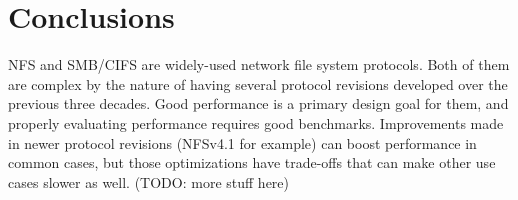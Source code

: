 \section{Conclusions}
NFS and SMB/CIFS are widely-used network file system protocols.
Both of them are complex by the nature of having several protocol revisions developed over the previous three decades.
Good performance is a primary design goal for them, and properly evaluating performance requires good benchmarks.
Improvements made in newer protocol revisions (NFSv4.1 for example) can boost performance in common cases,
but those optimizations have trade-offs that can make other use cases slower as well.
(TODO: more stuff here)
